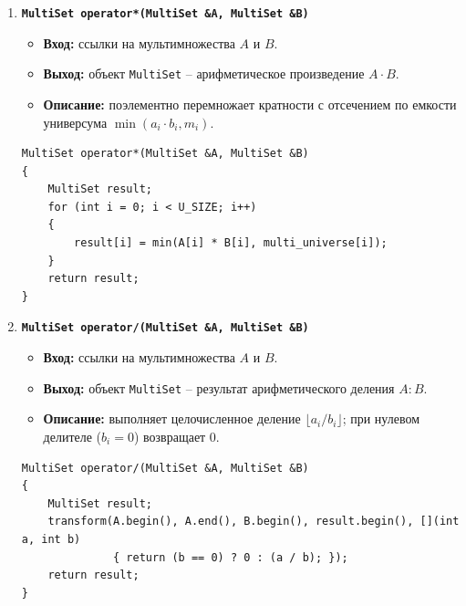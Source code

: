 \documentclass[14pt, a4paper]{extarticle}
\begin{document}
\begin{enumerate}[label=\arabic*., resume]
		\item \textbf{\texttt{MultiSet operator*(MultiSet \&A, MultiSet \&B)}}
		\begin{itemize}[leftmargin=*, noitemsep]
			\item \textbf{Вход:} ссылки на мультимножества $A$ и $B$.
			\item \textbf{Выход:} объект \texttt{MultiSet} -- арифметическое произведение $A \cdot B$.
			\item \textbf{Описание:} поэлементно перемножает кратности с отсечением по емкости универсума $\min(a_i \cdot b_i, m_i)$.
		\end{itemize}
		\begin{lstlisting}[caption={Оператор operator*}, label={lst:func_op_mul}]
MultiSet operator*(MultiSet &A, MultiSet &B)
{
    MultiSet result;
    for (int i = 0; i < U_SIZE; i++)
    {
        result[i] = min(A[i] * B[i], multi_universe[i]);
    }
    return result;
}
		\end{lstlisting}
		
		\item \textbf{\texttt{MultiSet operator/(MultiSet \&A, MultiSet \&B)}}
		\begin{itemize}[leftmargin=*, noitemsep]
			\item \textbf{Вход:} ссылки на мультимножества $A$ и $B$.
			\item \textbf{Выход:} объект \texttt{MultiSet} -- результат арифметического деления $A : B$.
			\item \textbf{Описание:} выполняет целочисленное деление $\lfloor a_i / b_i \rfloor$; при нулевом делителе ($b_i = 0$) возвращает 0.
		\end{itemize}
		\begin{lstlisting}[caption={Оператор operator/}, label={lst:func_op_div}]
MultiSet operator/(MultiSet &A, MultiSet &B)
{
    MultiSet result;
    transform(A.begin(), A.end(), B.begin(), result.begin(), [](int a, int b)
              { return (b == 0) ? 0 : (a / b); });
    return result;
}
		\end{lstlisting}
		

\end{enumerate}
\end{document}
